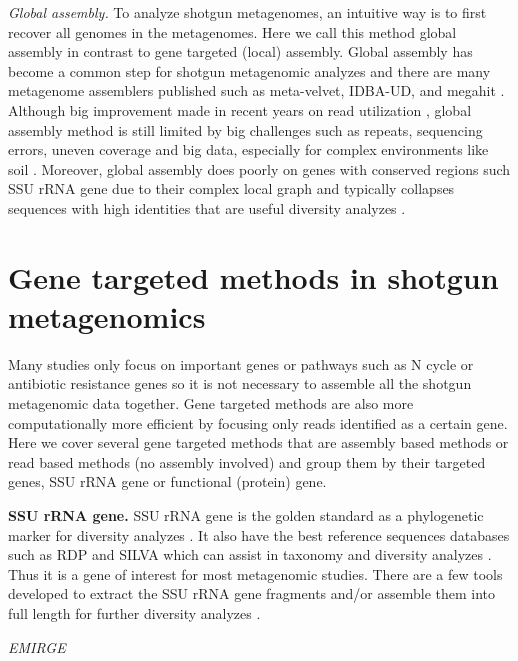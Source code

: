 \documentclass[]{msu-thesis}
\begin{document}
\textit{Global assembly. }
To analyze shotgun metagenomes, an intuitive way is to first recover all genomes in the metagenomes. Here we call this method global assembly in contrast to gene targeted (local) assembly. Global assembly has become a common step for shotgun metagenomic analyzes and there are many metagenome assemblers published such as meta-velvet, IDBA-UD, and megahit \cite{li_megahit:_2015,namiki_metavelvet:_2012,peng_idba-ud:_2012}.
Although big improvement made in recent years on read utilization \cite{li_megahit:_2015}, global assembly method is still limited by big challenges such as repeats, sequencing errors, uneven coverage and big data, especially for complex environments like soil \cite{howe_tackling_2014}. Moreover, global assembly does poorly on genes with conserved regions such SSU rRNA gene due to their complex local graph and typically collapses sequences with high identities that are useful diversity analyzes \cite{guo_microbial_2015,miller_emirge:_2011}.

\section{Gene targeted methods in shotgun metagenomics}

Many studies only focus on important genes or pathways such as N cycle or antibiotic resistance genes so it is not necessary to assemble all the shotgun metagenomic data together. Gene targeted methods are also more computationally more efficient by focusing only reads identified as a certain gene. Here we cover several gene targeted methods that are assembly based methods or read based methods (no assembly involved) and group them by their targeted genes, SSU rRNA gene or functional (protein) gene.

\textbf{SSU rRNA gene. }
SSU rRNA gene is the golden standard as a phylogenetic marker for diversity analyzes \cite{lane_rapid_1985,huse_exploring_2008}. It also have the best reference sequences databases such as RDP and SILVA which can assist in taxonomy and diversity analyzes \cite{cole_ribosomal_2014,quast_silva_2013}. Thus it is a gene of interest for most metagenomic studies. There are a few tools developed to extract the SSU rRNA gene fragments and/or assemble them into full length for further diversity analyzes \cite{miller_emirge:_2011,yuan_reconstructing_2015,guo_microbial_2015}.


\textit{EMIRGE}
\end{document}
